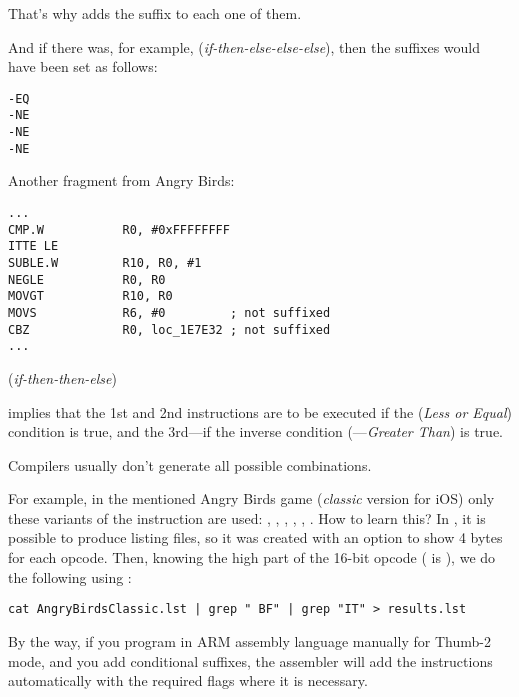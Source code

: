 That's why \IDA adds the  suffix to each one of them. 

And if there was, for example,  (\emph{if-then-else-else-else}), 
then the suffixes would have been set as follows:

\begin{lstlisting}
-EQ
-NE
-NE
-NE
\end{lstlisting}

Another fragment from Angry Birds:

\begin{lstlisting}[caption=Angry Birds Classic,style=customasmARM]
...
CMP.W           R0, #0xFFFFFFFF
ITTE LE
SUBLE.W         R10, R0, #1
NEGLE           R0, R0
MOVGT           R10, R0
MOVS            R6, #0         ; not suffixed
CBZ             R0, loc_1E7E32 ; not suffixed
...
\end{lstlisting}

 (\emph{if-then-then-else}) 

implies that the 1st and 2nd instructions are to be executed if the  (\emph{Less or Equal})
condition is true, and the 3rd---if the inverse condition (---\emph{Greater Than}) 
is true.

Compilers usually don't generate all possible combinations.

For example, in the mentioned Angry Birds game (\emph{classic} version for iOS)
only these variants of the  instruction are used: 
, , , , , .
\myindex{\GrepUsage}
How to learn this?
In \IDA, it is possible to produce listing files, so it was created with an option to show 4 bytes for each opcode.
Then, knowing the high part of the 16-bit opcode ( is ), we do the following using :

\begin{lstlisting}
cat AngryBirdsClassic.lst | grep " BF" | grep "IT" > results.lst
\end{lstlisting}


By the way, if you program in ARM assembly language manually for Thumb-2 mode, 
and you add conditional suffixes,
the assembler will add the  instructions automatically with the required flags where it is necessary.

\myparagraph{\NonOptimizingXcodeIV (\ARMMode)}

